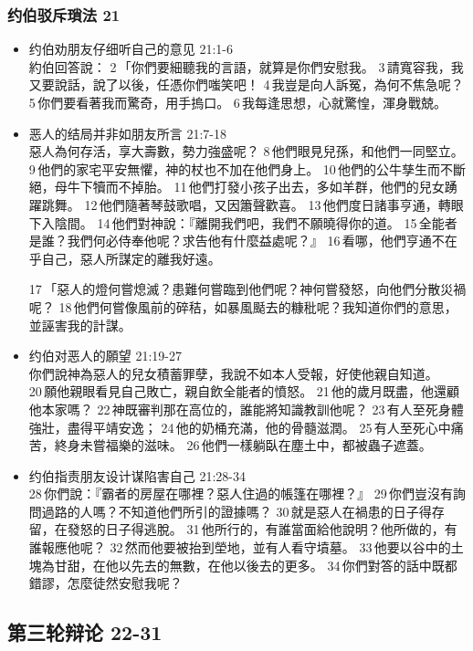 \subsubsection{约伯驳斥瑣法 21}
\begin{itemize}
\itemsep-.45em 
\item 约伯劝朋友仔细听自己的意见 21:1-6\\
約伯回答說： 2 「你們要細聽我的言語，就算是你們安慰我。 3 請寬容我，我又要說話，說了以後，任憑你們嗤笑吧！ 4 我豈是向人訴冤，為何不焦急呢？ 5 你們要看著我而驚奇，用手摀口。 6 我每逢思想，心就驚惶，渾身戰兢。
\item 恶人的结局并非如朋友所言 21:7-18\\
惡人為何存活，享大壽數，勢力強盛呢？ 8 他們眼見兒孫，和他們一同堅立。 9 他們的家宅平安無懼，神的杖也不加在他們身上。 10 他們的公牛孳生而不斷絕，母牛下犢而不掉胎。 11 他們打發小孩子出去，多如羊群，他們的兒女踴躍跳舞。 12 他們隨著琴鼓歌唱，又因簫聲歡喜。 13 他們度日諸事亨通，轉眼下入陰間。 14 他們對神說：『離開我們吧，我們不願曉得你的道。 15 全能者是誰？我們何必侍奉他呢？求告他有什麼益處呢？』 16 看哪，他們亨通不在乎自己，惡人所謀定的離我好遠。

17 「惡人的燈何嘗熄滅？患難何嘗臨到他們呢？神何嘗發怒，向他們分散災禍呢？ 18 他們何嘗像風前的碎秸，如暴風颳去的糠秕呢？我知道你們的意思，並誣害我的計謀。 

\item 约伯对恶人的願望 21:19-27\\
你們說神為惡人的兒女積蓄罪孽，我說不如本人受報，好使他親自知道。 20 願他親眼看見自己敗亡，親自飲全能者的憤怒。 21 他的歲月既盡，他還顧他本家嗎？ 22 神既審判那在高位的，誰能將知識教訓他呢？ 23 有人至死身體強壯，盡得平靖安逸； 24 他的奶桶充滿，他的骨髓滋潤。 25 有人至死心中痛苦，終身未嘗福樂的滋味。 26 他們一樣躺臥在塵土中，都被蟲子遮蓋。
\item 约伯指责朋友设计谋陷害自己 21:28-34\\
28 你們說：『霸者的房屋在哪裡？惡人住過的帳篷在哪裡？』 29 你們豈沒有詢問過路的人嗎？不知道他們所引的證據嗎？ 30 就是惡人在禍患的日子得存留，在發怒的日子得逃脫。 31 他所行的，有誰當面給他說明？他所做的，有誰報應他呢？ 32 然而他要被抬到塋地，並有人看守墳墓。 33 他要以谷中的土塊為甘甜，在他以先去的無數，在他以後去的更多。 34 你們對答的話中既都錯謬，怎麼徒然安慰我呢？
\end{itemize}

\subsection{第三轮辩论 22-31}
